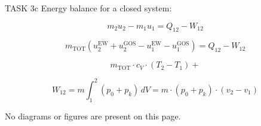 TASK 3c  
Energy balance for a closed system:  

\[
m_2 u_2 - m_1 u_1 = Q_{12} - W_{12}
\]

\[
m_{\text{TOT}} \left( u_2^{\text{EW}} + u_2^{\text{GOS}} - u_1^{\text{EW}} - u_1^{\text{GOS}} \right) = Q_{12} - W_{12}
\]

\[
m_{\text{TOT}} \cdot c_V \cdot (T_2 - T_1) +
\]

\[
W_{12} = m \int_1^2 (p_0 + p_k) \, dV = m \cdot (p_0 + p_k) \cdot (v_2 - v_1)
\]  

No diagrams or figures are present on this page.